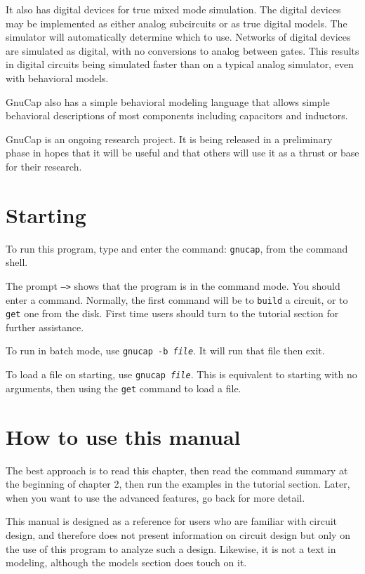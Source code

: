 It also has digital devices for true mixed mode simulation.  The digital
devices may be implemented as either analog subcircuits or as true digital
models.  The simulator will automatically determine which to use.  Networks
of digital devices are simulated as digital, with no conversions to analog
between gates.  This results in digital circuits being simulated faster than
on a typical analog simulator, even with behavioral models.

GnuCap also has a simple behavioral modeling language that allows simple
behavioral descriptions of most components including capacitors and
inductors.

GnuCap is an ongoing research project.  It is being released in a preliminary
phase in hopes that it will be useful and that others will use it as a
thrust or base for their research.
\section{Starting}

To run this program, type and enter the command: {\tt gnucap}, from
the command shell.

The prompt {\tt -->} shows that the program is in the command mode.  You
should enter a command.  Normally, the first command will be to {\tt build} a
circuit, or to {\tt get} one from the disk.  First time users should turn to
the tutorial section for further assistance. 

To run in batch mode, use {\tt gnucap -b {\em file}}.  It will run that
file then exit.

To load a file on starting, use {\tt gnucap {\em file}}.  This is
equivalent to starting with no arguments, then using the {\tt get}
command to load a file.
\section{How to use this manual}

The best approach is to read this chapter, then read the command summary at
the beginning of chapter 2, then run the examples in the tutorial section.
Later, when you want to use the advanced features, go back for more detail.

This manual is designed as a reference for users who are familiar with
circuit design, and therefore does not present information on circuit design
but only on the use of this program to analyze such a design.  Likewise, it
is not a text in modeling, although the models section does touch on it.

